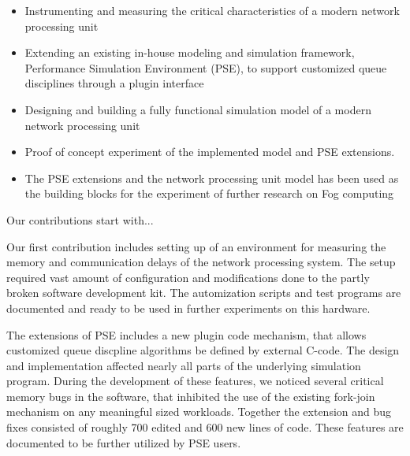 \begin{itemize}
\item Instrumenting and measuring the critical characteristics of a modern network processing unit
\item Extending an existing in-house modeling and simulation framework, Performance Simulation Environment (PSE), to support customized queue disciplines through a plugin interface %
\item Designing and building a fully functional simulation model of a modern network processing unit

\item Proof of concept experiment of the implemented model and PSE extensions.

\item The PSE extensions and the network processing unit model has been used as the building blocks for the experiment of further research on Fog computing
\end{itemize}

Our contributions start with...

Our first contribution includes setting up of an environment for measuring the memory and communication delays of the network processing system. The setup required vast amount of configuration and modifications done to the partly broken software development kit. The automization scripts and test programs are documented and ready to be used in further experiments on this hardware.

The extensions of PSE includes a new plugin code mechanism, that allows customized queue discpline algorithms be defined by external C-code. The design and implementation affected nearly all parts of the underlying simulation program. During the development of these features, we noticed several critical memory bugs in the software, that inhibited the use of the existing fork-join mechanism on any meaningful sized workloads. Together the extension and bug fixes consisted of roughly 700 edited and 600 new lines of code. These features are documented to be further utilized by PSE users.

